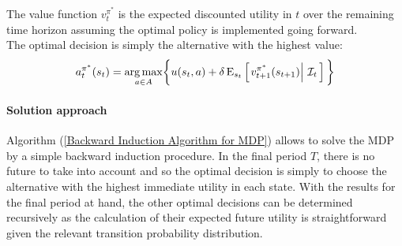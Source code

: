 The value function $v^{\pi^*}_t$ is the expected discounted utility in $t$ over the remaining time horizon assuming the optimal policy is implemented going forward.\\

The optimal decision is simply the alternative with the highest value:
%
\begin{align*}
a^{\pi^*}_t(s_t) = \underset{a\in A}{\operatorname*{arg\,max}} \bigg\{ u(s_t, a) + \delta\,\mathrm{E}_{s_t} \left[\left.v^{\pi^*}_{t + 1}(s_{t + 1})\right\vert\,\mathcal{I}_t\,\right] \bigg\}
\end{align*}

\paragraph{Solution approach} Algorithm (\ref{Backward Induction Algorithm for MDP}) allows to solve the MDP by a simple backward induction procedure. In the final period $T$, there is no future to take into account and so the optimal decision is simply to choose the alternative with the highest immediate utility in each state. With the results for the final period at hand, the other optimal decisions can be determined recursively as the calculation of their expected future utility is straightforward given the relevant transition probability distribution.

\vspace{0.5cm}
